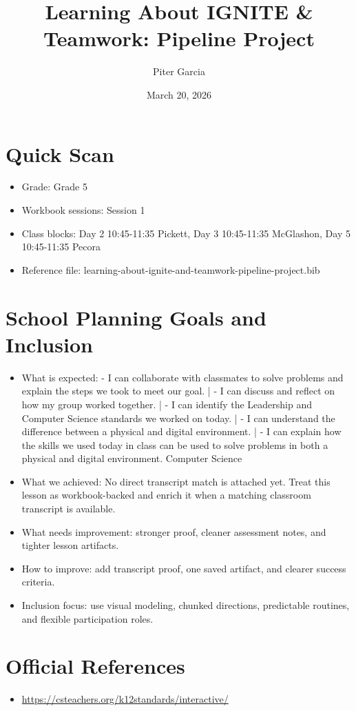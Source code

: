 \documentclass[11pt]{article}
\title{Learning About IGNITE & Teamwork: Pipeline Project}
\author{Piter Garcia}
\date{March 20, 2026}
\begin{document}
\maketitle
\section*{Quick Scan}
\begin{itemize}[leftmargin=*]
\item Grade: Grade 5
\item Workbook sessions: Session 1
\item Class blocks: Day 2 10:45-11:35 Pickett, Day 3 10:45-11:35 McGlashon, Day 5 10:45-11:35 Pecora
\item Reference file: learning-about-ignite-and-teamwork-pipeline-project.bib
\end{itemize}
\section*{School Planning Goals and Inclusion}
\begin{itemize}[leftmargin=*]
\item What is expected: - I can collaborate with classmates to solve problems and explain the steps we took to meet our goal. | - I can discuss and reflect on how my group worked together. | - I can identify the Leadership and Computer Science standards we worked on today. | - I can understand the difference between a physical and digital environment. | - I can explain how the skills we used today in class can be used to solve problems in both a physical and digital environment. Computer Science
\item What we achieved: No direct transcript match is attached yet. Treat this lesson as workbook-backed and enrich it when a matching classroom transcript is available.
\item What needs improvement: stronger proof, cleaner assessment notes, and tighter lesson artifacts.
\item How to improve: add transcript proof, one saved artifact, and clearer success criteria.
\item Inclusion focus: use visual modeling, chunked directions, predictable routines, and flexible participation roles.
\end{itemize}
\section*{Official References}
\begin{itemize}[leftmargin=*]
\item \url{https://csteachers.org/k12standards/interactive/}

\end{itemize}
\end{document}
